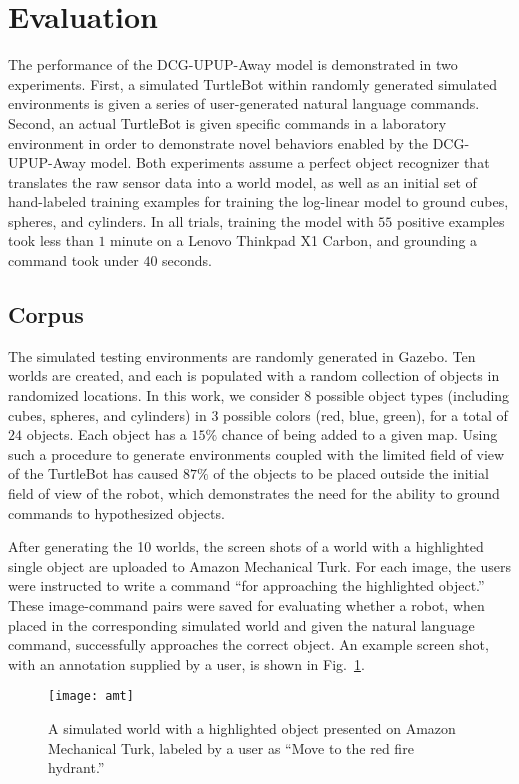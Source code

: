 \section{Evaluation}
\label{sec:evaluation}
The performance of the DCG-UPUP-Away model is demonstrated in two experiments.
First, a simulated TurtleBot within randomly generated simulated environments is given a series of user-generated natural language commands.
Second, an actual TurtleBot is given specific commands in a laboratory environment in order to demonstrate novel behaviors enabled by the DCG-UPUP-Away model.
Both experiments assume a perfect object recognizer that translates the raw sensor data into a world model, as well as an initial set of hand-labeled training examples for training the log-linear model to ground cubes, spheres, and cylinders.
In all trials, training the model with $55$ positive examples took less than $1$ minute on a Lenovo Thinkpad X1 Carbon, and grounding a command took under $40$ seconds.

\subsection{Corpus}
The simulated testing environments are randomly generated in Gazebo.
Ten worlds are created, and each is populated with a random collection of objects in randomized locations.
In this work, we consider $8$ possible object types (including cubes, spheres, and cylinders) in $3$ possible colors (red, blue, green), for a total of $24$ objects.
Each object has a $15\%$ chance of being added to a given map.
Using such a procedure to generate environments coupled with the limited field of view of the TurtleBot has caused $87\%$ of the objects to be placed outside the initial field of view of the robot, which demonstrates the need for the ability to ground commands to hypothesized objects.

After generating the 10 worlds, the screen shots of a world with a highlighted single object are uploaded to Amazon Mechanical Turk. For each image, the users were instructed to write a command ``for approaching the highlighted object.''
These image-command pairs were saved for evaluating whether a robot, when placed in the corresponding simulated world and given the natural language command, successfully approaches the correct object.
An example screen shot, with an annotation supplied by a user, is shown in Fig.~\ref{fig:amt}.
\begin{figure}[htb!]
	\centering
    \texttt{[image: amt]}
	\caption{A simulated world with a highlighted object presented on Amazon Mechanical Turk, labeled by a user as ``Move to the red fire hydrant.''}
	\label{fig:amt}
\end{figure}
